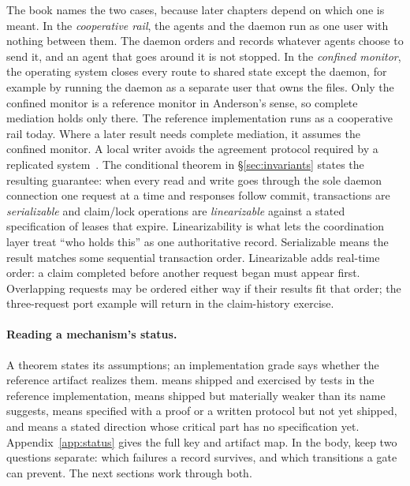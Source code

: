 \documentclass[11pt,a4paper]{article}
\theoremstyle{definition}
\theoremstyle{remark}
\begin{document}
The book names the two cases, because later chapters depend on which one is
meant. In the \emph{cooperative rail}, the agents and the daemon run as one
user with nothing between them. The daemon orders and records whatever agents
choose to send it, and an agent that goes around it is not stopped. In the
\emph{confined monitor}, the operating system closes every route to shared
state except the daemon, for example by running the daemon as a separate user
that owns the files. Only the confined monitor is a reference monitor in
Anderson's sense, so complete mediation holds only there. The reference
implementation runs as a cooperative rail today. Where a later result needs
complete mediation, it assumes the confined monitor.
%
A local writer avoids the agreement protocol required by a replicated
system~. The conditional theorem in
\S\ref{sec:invariants} states the resulting guarantee: when every read and write goes
through the sole daemon connection one request at a time and responses follow commit,
transactions are \emph{serializable} and claim/lock operations are \emph{linearizable}
against a stated specification of leases that expire. Linearizability is what lets the
coordination layer treat ``who holds this'' as one authoritative record. Serializable
means the result matches some sequential transaction order. Linearizable adds
real-time order: a claim completed before another request began must appear
first. Overlapping requests may be ordered either way if their results fit
that order; the three-request port example will return in the claim-history
exercise.
\paragraph{Reading a mechanism's status.}
A theorem states its assumptions; an implementation grade says whether the
reference artifact realizes them. \Built{} means shipped and exercised by tests in the reference
implementation, \BuiltWeak{} means shipped but materially weaker than its name
suggests, \Designed{} means specified with a proof or a written protocol but
not yet shipped, and \Vision{} means a stated direction whose critical part
has no specification yet.
Appendix~\ref{app:status} gives the full key and artifact map. In the body,
keep two questions separate: which failures a record survives, and which
transitions a gate can prevent. The next sections work through both.
\end{document}
